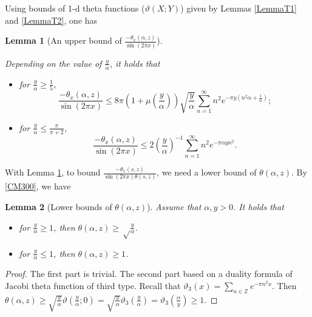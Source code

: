 \documentclass[reqno,english]{amsart}
\newtheorem{lemma}{Lemma}[section]
\newtheorem{open problem}{Open Problem}[section]
\newtheorem{open question}{Open Question}[section]
\newtheorem{open questions on hexagonal lattice}{Open Questions on hexagonal lattice}[section]
\begin{document}
Using bounds of 1-d theta functions ($\vartheta(X;Y)$) given by Lemmas \ref{LemmaT1} and \ref{LemmaT2}, one has

\begin{lemma}[An upper bound of $\frac{-\theta_x(\alpha,z)}{\sin(2\pi x)}$]\label{Lemma4.2}

Depending on the value of $\frac{y}{\alpha}$, it holds that

\begin{itemize}
  \item for $\frac{y}{\alpha}\geq\frac{1}{5}$, $$\frac{-\theta_x(\alpha,z)}{\sin(2\pi x)}\leq
8\pi(1+\mu(\frac{y}{\alpha}))\sqrt{\frac{y}{\alpha}}\sum_{n=1}^\infty n^2 e^{-\pi y (n^2 \alpha+\frac{1}{\alpha})};$$
  \item for $\frac{y}{\alpha}\leq\frac{\pi}{\pi+2}$, $$\frac{-\theta_x(\alpha,z)}{\sin(2\pi x)}\leq2(\frac{y}{\alpha})^{-1}\sum_{n=1}^\infty n^2 e^{-\pi\alpha y n^2}.$$
\end{itemize}





\end{lemma}

With Lemma \ref{Lemma4.2}, to bound $\frac{-\theta_x(s,z)}{\sin(2\pi x)\theta(s,z)}$, we need a lower bound of $\theta(\alpha,z)$. By
\eqref{CM300}, we have
\begin{lemma}[Lower bounds of $\theta(\alpha,z)$]\label{Lemma4.3} Assume that $\alpha, y>0$.
It holds that
\begin{itemize}
  \item  for $\frac{y}{\alpha}\geq1$, then $\theta(\alpha,z)\geq\sqrt\frac{y}{\alpha}$.
  \item  for $\frac{y}{\alpha}\leq1$, then $\theta(\alpha,z)\geq1$.
\end{itemize}
\end{lemma}

\begin{proof} The first part is trivial. The second part based on a duality formula of Jacobi theta function of third type. Recall that $
\vartheta_3(x)=\sum_{n\in\mathbb{Z}}e^{-\pi n^2 x}.$
Then $\theta(\alpha,z)\geq\sqrt{\frac{y}{\alpha}}\vartheta(\frac{y}{\alpha};0)
=\sqrt{\frac{y}{\alpha}}\vartheta_3(\frac{y}{\alpha})=\vartheta_3(\frac{\alpha}{y})\geq1$.

\end{proof}
\end{document}
